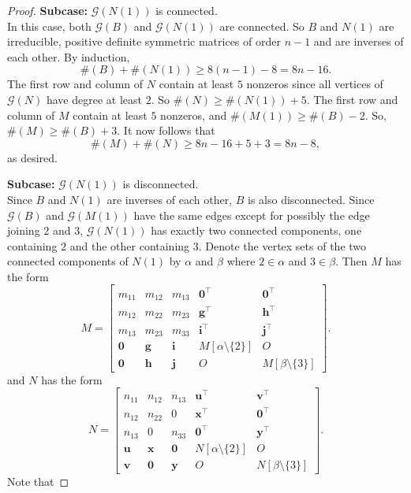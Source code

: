 \documentclass[10pt,a4paper]{amsart}
\newcommand{\G}{\mathcal{G}}
\begin{document}
\begin{proof}
\bigskip\noindent
{\bf Subcase:} $\G(N(1))$ is connected.
\\
In this case, both  $\G(B)$  and $\G(N(1))$ are connected. So $B$ and $N(1)$ 
are irreducible, positive definite symmetric matrices of order $n-1$ 
and are inverses of each other. By induction, 
\[ \#(B) + \#(N(1))\geq 8(n-1)-8=8n-16.\]
The first row and column of $N$ contain at least $5$ nonzeros since all vertices of $\G(N)$ have degree at least $2$.
So $\#(N)\geq \#(N(1))+5$.  The first row and column of $M$ contain 
at least $5$ nonzeros, and $\#(M(1))\geq \#(B)-2$.  So, 
$\#(M) \geq \#(B)+3$.  It now follows that 
\[ \#(M) +\#(N) \geq 8n-16 + 5 + 3=8n-8,\] as desired. 

\bigskip\noindent
{\bf Subcase:} $\G(N(1))$ is disconnected.
\\
Since $B$ and $N(1)$ are inverses of each other, $B$ is also disconnected.  
Since $\G(B)$ and $\G(M(1))$ have the same edges except for possibly the edge joining $2$ and $3$, $\mathcal{G}(N(1))$ has exactly two 
connected components, one containing $2$ and 
the other containing $3$. Denote the vertex sets of the two connected components of $N(1)$ by $ \alpha$ and $ \beta$ where $2 \in \alpha$
and $3 \in \beta$.
Then  $M$ has the form 
\[ 
M= 
\left[ \begin{array}{ccc|c|c}
m_{11} & m_{12} & m_{13} & \mathbf 0^{\top} & \mathbf{0}^{\top}\\
m_{12} & m_{22} & m_{23} & \mathbf g^{\top} & \mathbf h^{\top} \\
m_{13} & m_{23} & m_{33} & \mathbf i^{\top} & \mathbf j^{\top}  \\ \hline
\mathbf 0 & \mathbf g &\mathbf i &  M[\alpha\setminus\{2\} ] & O 
\\ \hline 
\mathbf 0 & \mathbf h & \mathbf j &  O & M[\beta\setminus \{3\}] 
\end{array} \right] .  
\] 
and $N$ has the form 
\[
N= 
\left[ 
\begin{array}{ccc|c|c} 
n_{11} & n_{12} & n_{13} & \mathbf u^{\top} & \mathbf v^{\top} \\
n_{12} & n_{22}  & 0 & \mathbf x^{\top} & \mathbf 0^{\top}\\
n_{13} & 0 & n_{33} &  \mathbf 0^{\top} & \mathbf y^{\top} \\ \hline 
\mathbf u & \mathbf x &  \mathbf 0 &  N[\alpha\setminus\{2\}] & O \\ \hline 
\mathbf v & \mathbf {0} & {\mathbf y} & O & N[\beta
\setminus\{3\} ]
\end{array} 
\right] .
\] 
Note that  

\end{proof}
\end{document}
